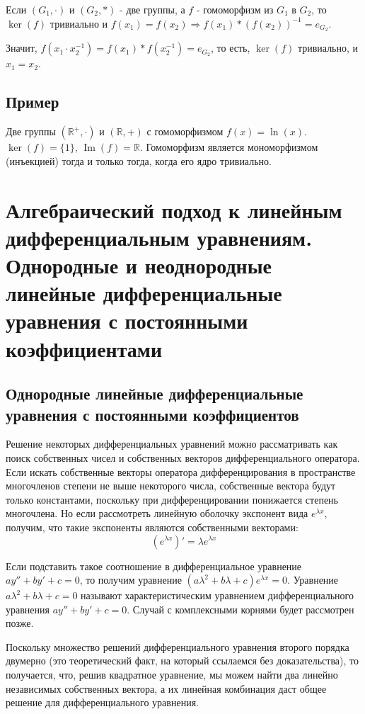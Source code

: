 \documentclass[12pt]{article}
\begin{document}
Если $(G_1,\cdot)$ и $(G_2,*)$ - две группы, а $f$ - гомоморфизм из $G_1$ в $G_2$, то $\operatorname{ker}(f)$ тривиально и $f(x_1)=f(x_2)\Rightarrow f(x_1)*(f(x_2))^{-1}=e_{G_2}$.

Значит, $f(x_1\cdot x_2^{-1})=f(x_1)*f(x_2^{-1})=e_{G_2}$, то есть, $\operatorname{ker}(f)$ тривиально, и $x_1=x_2$.

\subsection{Пример}

Две группы $(\mathbb{R}^{+},\cdot)$ и $(\mathbb{R},+)$ с гомоморфизмом $f(x) = \ln(x)$. $\ker(f) = \{1\}$, $\operatorname{Im}(f) = \mathbb{R}$. Гомоморфизм является мономорфизмом (инъекцией) тогда и только тогда, когда его ядро тривиально.

\section{Алгебраический подход к линейным дифференциальным уравнениям. Однородные и неоднородные линейные дифференциальные уравнения с постоянными коэффициентами}

\subsection{Однородные линейные дифференциальные уравнения с постоянными коэффициентов}
Решение некоторых дифференциальных уравнений можно рассматривать как поиск
собственных чисел и собственных векторов дифференциального оператора.  Если искать собственные векторы оператора дифференцирования в пространстве многочленов степени не выше некоторого числа, собственные вектора будут только константами, поскольку при дифференцировании понижается степень многочлена. Но если рассмотреть линейную оболочку экспонент вида $e^{\lambda x}$, получим, что такие экспоненты являются собственными векторами:
\[
    (e^{\lambda x})' = \lambda e^{\lambda x}
\]

Если подставить такое соотношение в дифференциальное уравнение $ay'' + by' + c = 0$, то получим уравнение $(a\lambda^2 + b\lambda + c)e^{\lambda x} = 0$.
Уравнение $a\lambda^2 + b\lambda + c = 0$ называют характеристическим уравнением дифференциального уравнения $ay'' + by' + c = 0$. Случай с комплексными корнями будет рассмотрен позже.

Поскольку множество решений дифференциального уравнения второго порядка двумерно (это теоретический факт, на который ссылаемся без доказательства), то получается, что, решив квадратное уравнение, мы можем найти два линейно независимых собственных вектора, а их линейная комбинация даст общее решение для дифференциального уравнения.
\end{document}
